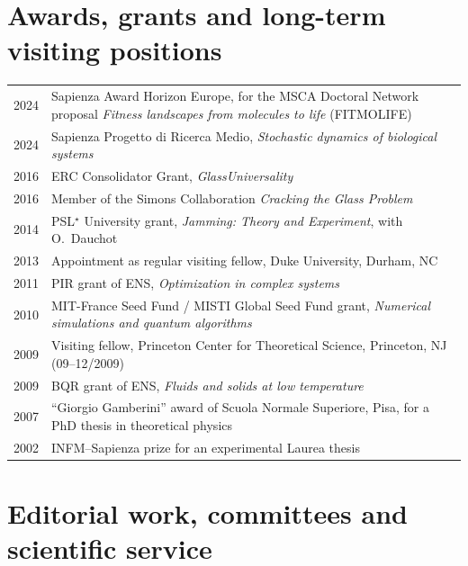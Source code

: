 \documentclass[a4paper,10pt]{article}
\begin{document}
\section{Awards, grants and long-term visiting positions}

\begin{tabularx}{\textwidth}{@{}D L@{}}
2024 & Sapienza Award Horizon Europe, for the MSCA Doctoral Network proposal \emph{Fitness landscapes from molecules to life} (FITMOLIFE) \\
2024 & Sapienza Progetto di Ricerca Medio, \emph{Stochastic dynamics of biological systems} \\
2016 & ERC Consolidator Grant, \emph{GlassUniversality} \\
2016 & Member of the Simons Collaboration \emph{Cracking the Glass Problem} \\
2014 & PSL$^\star$ University grant, \emph{Jamming: Theory and Experiment}, with O.~Dauchot \\
2013 & Appointment as regular visiting fellow, Duke University, Durham, NC \\
2011 & PIR grant of ENS, \emph{Optimization in complex systems} \\
2010 & MIT-France Seed Fund / MISTI Global Seed Fund grant, \emph{Numerical simulations and quantum algorithms} \\
2009 & Visiting fellow, Princeton Center for Theoretical Science, Princeton, NJ (09--12/2009) \\
2009 & BQR grant of ENS, \emph{Fluids and solids at low temperature} \\
2007 & ``Giorgio Gamberini'' award of Scuola Normale Superiore, Pisa, for a PhD thesis in theoretical physics \\
2002 & INFM--Sapienza prize for an experimental Laurea thesis \\
\end{tabularx}

\section{Editorial work, committees and scientific service}
\end{document}
